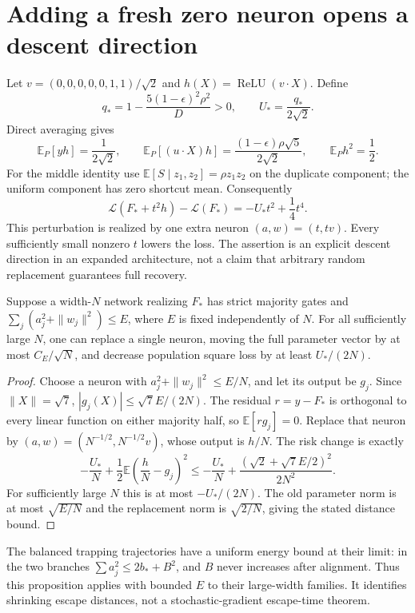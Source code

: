 \documentclass[11pt]{article}
\newcommand{\E}{\mathbb E}\newcommand{\R}{\mathbb R}
\begin{document}
\section{Adding a fresh zero neuron opens a descent direction}
Let $v=(0,0,0,0,0,1,1)/\sqrt2$ and $h(X)=\operatorname{ReLU}(v\cdot X)$.
Define
\[
 q_* =1-\frac{5(1-\epsilon)^2\rho^2}{D}>0,
 \qquad U_* =\frac{q_*}{2\sqrt2}.
\]
Direct averaging gives
\[
 \E_P[yh]=\frac1{2\sqrt2},\qquad
 \E_P[(u\cdot X)h]=\frac{(1-\epsilon)\rho\sqrt5}{2\sqrt2},
 \qquad \E_Ph^2=\frac12.
\]
For the middle identity use
$\E[S\mid z_1,z_2]=\rho z_1z_2$ on the duplicate component;
the uniform component has zero shortcut mean. Consequently
\[
 \mathcal L(F_*+t^2h)-\mathcal L(F_*)=-U_*t^2+\frac14t^4.   \tag{1}
\]
This perturbation is realized by one extra neuron $(a,w)=(t,tv)$.
Every sufficiently small nonzero $t$ lowers the loss. The assertion
is an explicit descent direction in an expanded architecture, not a
claim that arbitrary random replacement guarantees full recovery.

\begin{proposition}
Suppose a width-$N$ network realizing $F_*$ has strict majority gates
and $\sum_j(a_j^2+\|w_j\|^2)\le E$, where $E$ is fixed independently
of $N$. For all sufficiently large $N$, one can replace a single
neuron, moving the full parameter vector by at most $C_E/\sqrt N$,
and decrease population square loss by at least $U_*/(2N)$.
\end{proposition}
\begin{proof}
Choose a neuron with $a_j^2+\|w_j\|^2\le E/N$, and let its output
be $g_j$. Since $\|X\|=\sqrt7$,
$|g_j(X)|\le\sqrt7 E/(2N)$.
The residual $r=y-F_*$ is orthogonal to every linear function on
either majority half, so $\E[r g_j]=0$.
Replace that neuron by $(a,w)=(N^{-1/2},N^{-1/2}v)$, whose output is
$h/N$. The risk change is exactly
\[
 -\frac{U_*}{N}+\frac12\E\left(\frac hN-g_j\right)^2
 \le -\frac{U_*}{N}
 +\frac{(\sqrt2+\sqrt7 E/2)^2}{2N^2}.
\]
For sufficiently large $N$ this is at most $-U_*/(2N)$.
The old parameter norm is at most $\sqrt{E/N}$ and the replacement
norm is $\sqrt{2/N}$, giving the stated distance bound.
\end{proof}
The balanced trapping trajectories have a uniform energy bound at their
limit: in the two branches $\sum a_j^2\le2b_*+B^2$, and $B$ never
increases after alignment. Thus this proposition applies with bounded
$E$ to their large-width families. It identifies shrinking escape
distances, not a stochastic-gradient escape-time theorem.
\end{document}
